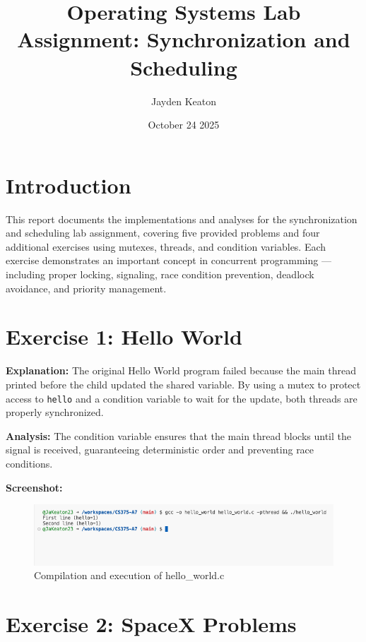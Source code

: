 \documentclass[a4paper,12pt]{article}
\begin{document}
\title{Operating Systems Lab Assignment: Synchronization and Scheduling}
\author{Jayden Keaton}
\date{October 24 2025}
\maketitle

\section{Introduction}
This report documents the implementations and analyses for the synchronization and scheduling lab assignment, covering five provided problems and four additional exercises using mutexes, threads, and condition variables.  
Each exercise demonstrates an important concept in concurrent programming — including proper locking, signaling, race condition prevention, deadlock avoidance, and priority management.

\section{Exercise 1: Hello World}


\textbf{Explanation:}  
The original Hello World program failed because the main thread printed before the child updated the shared variable. By using a mutex to protect access to \texttt{hello} and a condition variable to wait for the update, both threads are properly synchronized.

\textbf{Analysis:}  
The condition variable ensures that the main thread blocks until the signal is received, guaranteeing deterministic order and preventing race conditions.

\textbf{Screenshot:}  
\begin{figure}[h]
\centering
\includegraphics[width=\textwidth]{hello_world_output.png}
\caption{Compilation and execution of hello\_world.c}
\end{figure}

\section{Exercise 2: SpaceX Problems}

\end{document}
